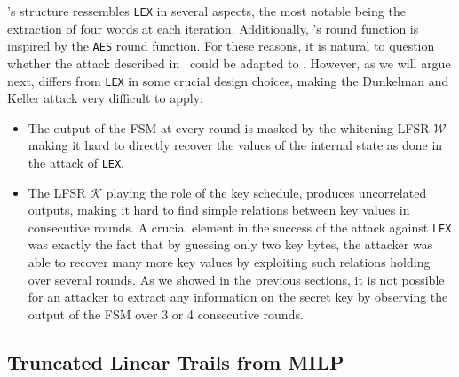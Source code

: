 \coolName{}'s structure ressembles {\tt LEX} in several aspects, the most notable being the extraction of four words at each iteration. Additionally, \coolName{}'s round function is inspired by the {\tt \gls{AES}} round function. For these reasons, it is natural to question whether the attack described in~\cite{AC:DunKel08b} could be adapted to \coolName{}. However, as we will argue next,  \coolName{} differs from {\tt LEX} in some crucial design choices, making the Dunkelman and Keller attack very difficult to apply:

\begin{itemize}
\item The output of the FSM at every round is masked by the whitening LFSR $\mathcal{W}$ making it hard to directly recover the values of the internal state as done in the attack of {\tt LEX}.
\item The LFSR $\mathcal{K}$ playing the role of the key schedule, produces uncorrelated outputs, making it hard to find simple relations between key values in consecutive rounds. A crucial element in the success of the attack against {\tt LEX} was exactly the fact that by guessing only two key bytes, the attacker was able to recover many more key values by exploiting such relations holding over several rounds. As we showed in the previous sections, it is not possible for an attacker to extract any information on the secret key by observing the output of the FSM over 3 or 4 consecutive rounds. 
\end{itemize}


\subsection{Truncated Linear Trails from MILP}
\label{sec:milp}


